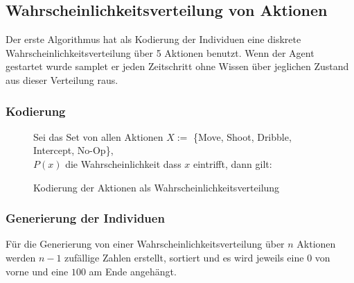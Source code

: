 \newpage

        \subsection{Wahrscheinlichkeitsverteilung von Aktionen}

            Der erste Algorithmus hat als Kodierung der Individuen eine diskrete Wahrscheinlichkeitsverteilung über 5 Aktionen benutzt. Wenn der Agent gestartet wurde samplet er jeden Zeitschritt ohne Wissen über jeglichen Zustand aus dieser Verteilung raus.

            \subsubsection*{Kodierung}

            \begin{figure}[H]
                \begin{mdframed}
                    Sei das Set von allen Aktionen $ X := $ \{Move, Shoot, Dribble, Intercept, No-Op\}, \\
                    $P(x)$ die Wahrscheinlichkeit dass $x$ eintrifft, dann gilt: \\[2mm]
                    \hspace*{25mm} 
                \end{mdframed}
                \caption{\label{kodierung} Kodierung der Aktionen als Wahrscheinlichkeitsverteilung}
            \end{figure}


            \subsubsection*{Generierung der Individuen}
            Für die Generierung von einer Wahrscheinlichkeitsverteilung über $n$ Aktionen werden $n-1$ zufällige Zahlen erstellt, sortiert und es wird jeweils eine $0$ von vorne und eine $100$ am Ende angehängt.

